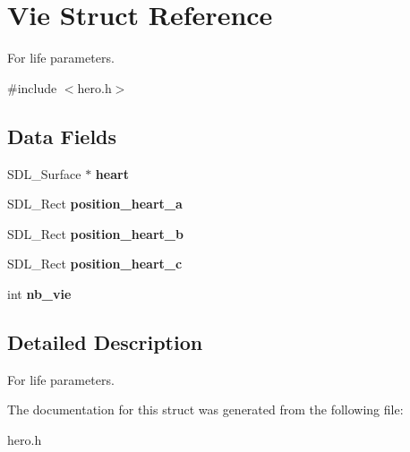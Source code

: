 \hypertarget{structVie}{}\section{Vie Struct Reference}
\label{structVie}


For life parameters.  




{\ttfamily \#include $<$hero.\+h$>$}

\subsection*{Data Fields}
\begin{DoxyCompactItemize}
\item 
\mbox{\label{structVie_a2656effa8772d33fe9d4d52212db99dc}} 
S\+D\+L\+\_\+\+Surface $\ast$ {\bfseries heart}
\item 
\mbox{\label{structVie_a7076ab45d1bad6fef6159b35d8056109}} 
S\+D\+L\+\_\+\+Rect {\bfseries position\+\_\+heart\+\_\+a}
\item 
\mbox{\label{structVie_ac0fc02d542c34723253eeca8cf4b8125}} 
S\+D\+L\+\_\+\+Rect {\bfseries position\+\_\+heart\+\_\+b}
\item 
\mbox{\label{structVie_a0398326a6888247e76c1669bf2cd9d11}} 
S\+D\+L\+\_\+\+Rect {\bfseries position\+\_\+heart\+\_\+c}
\item 
\mbox{\label{structVie_a133255bdd7e91d9c2d90eaf71239540d}} 
int {\bfseries nb\+\_\+vie}
\end{DoxyCompactItemize}


\subsection{Detailed Description}
For life parameters. 

The documentation for this struct was generated from the following file\+:\begin{DoxyCompactItemize}
\item 
hero.\+h\end{DoxyCompactItemize}
